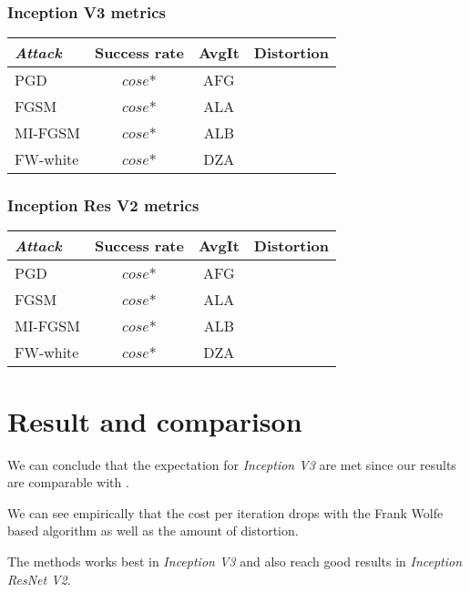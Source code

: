 \documentclass[10pt,twocolumn,letterpaper, english]{article}
\theoremstyle{definition}
\theoremstyle{plain}
\theoremstyle{plain}
\theoremstyle{plain}
\theoremstyle{plain}
\theoremstyle{remark}
\theoremstyle{remark}
\theoremstyle{definition}
\theoremstyle{definition}
\theoremstyle{definition}
\theoremstyle{definition}
\begin{document}
\subsubsection{Inception V3 metrics}

\begin{center}
    

\begin{tabular}{ |l|c|c|c| }
 \hline
  \textit{Attack} & Success rate & AvgIt & Distortion \\
 \hline
 
 PGD   & $cose$*   &  AFG &\\
 FGSM&   $cose$*  & ALA  &  \\
 MI-FGSM & $cose$* & ALB &\\
 FW-white & $cose$* & DZA &\\
\hline
\end{tabular}
\end{center}


\subsubsection{Inception Res V2 metrics}

\begin{center}
    

\begin{tabular}{ |l|c|c|c| }
 \hline
  \textit{Attack} & Success rate & AvgIt & Distortion \\
 \hline
 
 PGD   & $cose$*   &  AFG &\\
 FGSM&   $cose$*  & ALA  &  \\
 MI-FGSM & $cose$* & ALB &\\
 FW-white & $cose$* & DZA &\\
\hline
\end{tabular}
\end{center}


\section{Result and comparison}



We can conclude that the expectation for \textit{Inception V3} are met since our results are comparable with \cite{frank}.

We can see empirically that the cost per iteration drops with the Frank Wolfe based algorithm as well as the amount of distortion.

The methods works best in \textit{Inception V3} and also reach good results in \textit{Inception ResNet V2}.







{\small


}









\end{document}
